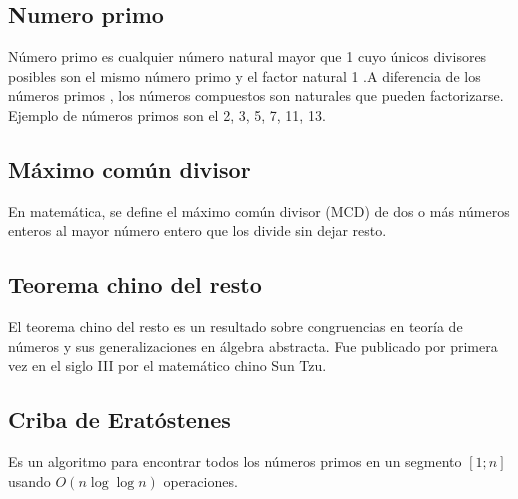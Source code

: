 \subsection{Numero primo}
Número primo es cualquier número natural mayor que 1 cuyo únicos divisores posibles son el mismo número primo y el factor natural 1 .A diferencia de los números primos , los números compuestos son naturales que pueden factorizarse. Ejemplo de números primos son el 2, 3, 5, 7, 11, 13.

\subsection{Máximo común divisor}
En matemática, se define el máximo común divisor (MCD) de dos o más números enteros al mayor número entero que los divide sin dejar resto.

\subsection{Teorema chino del resto}
El teorema chino del resto es un resultado sobre congruencias en teoría de números y sus generalizaciones en álgebra abstracta. Fue publicado por primera vez en el siglo III por el matemático chino Sun Tzu. 

\subsection{Criba de Eratóstenes}
Es un algoritmo para encontrar todos los números primos en un segmento $[1;n]$ usando $O(n \log \log n)$ operaciones.

